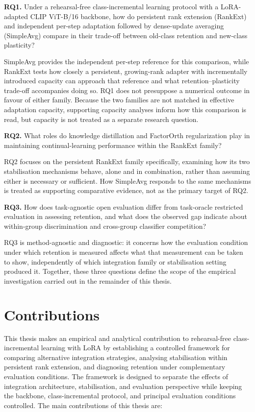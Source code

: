 \textbf{RQ1.} Under a rehearsal-free class-incremental learning protocol
with a LoRA-adapted CLIP ViT-B/16 backbone, how do persistent rank
extension (RankExt) and independent per-step adaptation followed by
dense-update averaging (SimpleAvg) compare in their trade-off between
old-class retention and new-class plasticity?

SimpleAvg provides the independent per-step reference for this
comparison, while RankExt tests how closely a persistent, growing-rank
adapter with incrementally introduced capacity can approach that reference
and what retention--plasticity trade-off accompanies doing so. RQ1 does
not presuppose a numerical outcome in favour of either family. Because the
two families are not matched in effective adaptation capacity, supporting
capacity analyses inform how this comparison is read, but capacity is not
treated as a separate research question.

\textbf{RQ2.} What roles do knowledge distillation and FactorOrth
regularization play in maintaining continual-learning performance within
the RankExt family?

RQ2 focuses on the persistent RankExt family specifically, examining how
its two stabilisation mechanisms behave, alone and in combination, rather
than assuming either is necessary or sufficient. How SimpleAvg responds to
the same mechanisms is treated as supporting comparative evidence, not as
the primary target of RQ2.

\textbf{RQ3.} How does task-agnostic open evaluation differ from
task-oracle restricted evaluation in assessing retention, and what does the
observed gap indicate about within-group discrimination and cross-group
classifier competition?

RQ3 is method-agnostic and diagnostic: it concerns how the evaluation
condition under which retention is measured affects what that measurement
can be taken to show, independently of which integration family or
stabilisation setting produced it. Together, these three questions define
the scope of the empirical investigation carried out in the remainder of
this thesis.

\section{Contributions}
\label{sec:ch1-contributions}

This thesis makes an empirical and analytical contribution to
rehearsal-free class-incremental learning with LoRA by establishing a
controlled framework for comparing alternative integration strategies,
analysing stabilisation within persistent rank extension, and diagnosing
retention under complementary evaluation conditions. The framework is
designed to separate the effects of integration architecture,
stabilisation, and evaluation perspective while keeping the backbone,
class-incremental protocol, and principal evaluation conditions
controlled. The main contributions of this thesis are:

